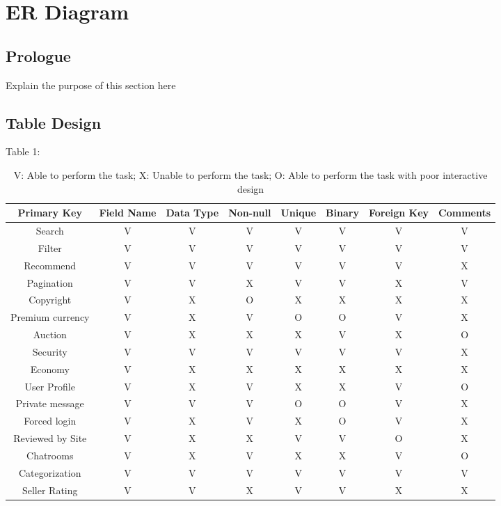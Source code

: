 \documentclass[]{article}
\begin{document}
	\section{ER Diagram}
	\subsection{Prologue}
		Explain the purpose of this section here
		
	\begin{figure}[!htb] %
	\end{figure}

	\newpage

	\subsection{Table Design} %
	
	Table 1: 
	
	\begin{table}[!htb]
		\begin{tabular}{|c|c|c|c|c|c|c|c|}
			\hline Primary Key & Field Name & Data Type & Non-null & Unique & Binary & Foreign Key & Comments \\
			\hline Search & V & V & V & V & V & V & V\\
			\hline Filter & V & V & V & V & V & V & V\\
			\hline Recommend & V & V & V & V & V & V & X\\
			\hline Pagination & V & V & X & V & V & X & V\\
			\hline Copyright & V & X & O & X & X & X & X\\
			\hline Premium currency & V & X & V & O & O & V & X\\
			\hline Auction & V & X & X & X & V & X & O\\
			\hline Security & V & V & V & V & V & V & X\\
			\hline Economy & V & X & X & X & X & X & X\\
			\hline User Profile & V & X & V & X & X & V & O\\
			\hline Private message & V & V & V & O & O & V & X\\
			\hline Forced login & V & X & V & X & O & V & X\\
			\hline Reviewed by Site & V & X & X & V & V & O & X\\
			\hline Chatrooms & V & X & V & X & X & V & O\\
			\hline Categorization & V & V & V & V & V & V & V\\
			\hline Seller Rating & V & V & X & V & V & X & X\\ 
			\hline
		\end{tabular}
		\caption{V: Able to perform the task; X: Unable to perform the task; O: Able to perform the task with poor interactive design}
		\end{table}
	
\end{document}
